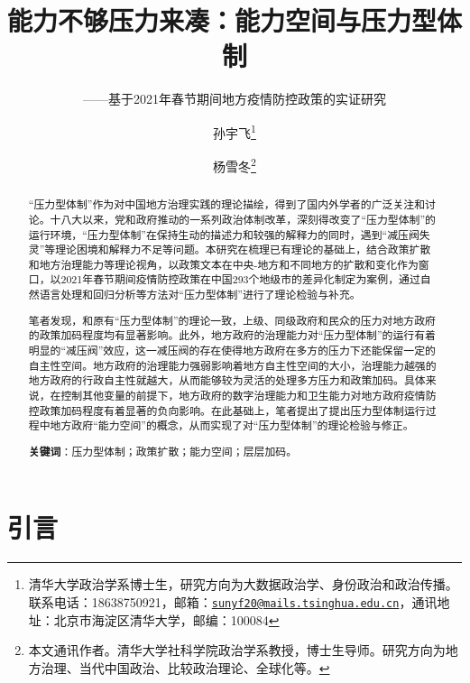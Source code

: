 \documentclass[
  12pt,
]{ctexart}
\title{能力不够压力来凑：能力空间与压力型体制}
\subtitle{------基于2021年春节期间地方疫情防控政策的实证研究}
\author{孙宇飞\footnote{清华大学政治学系博士生，研究方向为大数据政治学、身份政治和政治传播。联系电话：18638750921，邮箱：\href{mailto:sunyf20@mails.tsinghua.edu.cn}{\nolinkurl{sunyf20@mails.tsinghua.edu.cn}}，通讯地址：北京市海淀区清华大学，邮编：100084} \and 杨雪冬\footnote{本文通讯作者。清华大学社科学院政治学系教授，博士生导师。研究方向为地方治理、当代中国政治、比较政治理论、全球化等。}}
\date{}
\begin{document}
\maketitle
\begin{abstract}
``压力型体制''作为对中国地方治理实践的理论描绘，得到了国内外学者的广泛关注和讨论。十八大以来，党和政府推动的一系列政治体制改革，深刻得改变了``压力型体制''的运行环境，``压力型体制''在保持生动的描述力和较强的解释力的同时，遇到``减压阀失灵''等理论困境和解释力不足等问题。本研究在梳理已有理论的基础上，结合政策扩散和地方治理能力等理论视角，以政策文本在中央-地方和不同地方的扩散和变化作为窗口，以2021年春节期间疫情防控政策在中国293个地级市的差异化制定为案例，通过自然语言处理和回归分析等方法对``压力型体制''进行了理论检验与补充。

笔者发现，和原有``压力型体制''的理论一致，上级、同级政府和民众的压力对地方政府的政策加码程度均有显著影响。此外，地方政府的治理能力对``压力型体制''的运行有着明显的``减压阀''效应，这一减压阀的存在使得地方政府在多方的压力下还能保留一定的自主性空间。地方政府的治理能力强弱影响着地方自主性空间的大小，治理能力越强的地方政府的行政自主性就越大，从而能够较为灵活的处理多方压力和政策加码。具体来说，在控制其他变量的前提下，地方政府的数字治理能力和卫生能力对地方政府疫情防控政策加码程度有着显著的负向影响。在此基础上，笔者提出了提出压力型体制运行过程中地方政府``能力空间''的概念，从而实现了对``压力型体制''的理论检验与修正。

\textbf{关键词}：压力型体制；政策扩散；能力空间；层层加码。
\end{abstract}

\hypertarget{ux5f15ux8a00}{%
\section{引言}\label{ux5f15ux8a00}}
\end{document}
